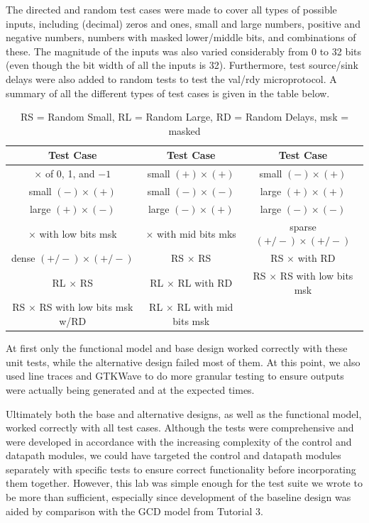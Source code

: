 \documentclass[10pt]{article}
\begin{document}
The directed and random test cases were made to cover all types of possible inputs, including (decimal) zeros and ones, small and large numbers, positive and negative numbers, numbers with masked lower/middle bits, and combinations of these. The magnitude of the inputs was also varied considerably from 0 to 32 bits (even though the bit width of all the inputs is 32). Furthermore, test source/sink delays were also added to random tests to test the val/rdy microprotocol. A summary of all the different types of test cases is given in the table below.
\begin{table}[h]
\begin{tabular}{|c | c | c|}
\hline
\textbf{Test Case}                    & \textbf{Test Case}                   & \textbf{Test Case}               \\
\hline
$\times$ of 0, 1, and $-1$            & small $(+) \times (+)$               & small $(-) \times (+)$           \\
small $(-) \times (+)$                & small $(-) \times (-)$               & large $(+) \times (+)$           \\
large $(+) \times (-)$                & large $(-) \times (+)$               & large $(-) \times (-)$           \\
$\times$ with low bits msk            & $\times$ with mid bits mks           & sparse $(+/-) \times (+/-)$      \\
dense  $(+/-) \times (+/-)$           & RS $\times$ RS                       & RS $\times$ with RD              \\
RL $\times$ RS                        & RL $\times$ RL with RD               & RS $\times$ RS with low bits msk \\
RS $\times$ RS with low bits msk w/RD & RL $\times$ RL with mid bits msk     &                                  \\
\hline                                                 
\end{tabular}
\caption{RS = Random Small, RL = Random Large, RD = Random Delays, msk = masked} 
\end{table}
At first only the functional model and base design worked correctly with these unit tests, while the alternative design failed most of them. At this point, we also used line traces and GTKWave to do more granular testing to ensure outputs were actually being generated and at the expected times. 

Ultimately both the base and alternative designs, as well as the functional model, worked correctly with all test cases. Although the tests were comprehensive and were developed in accordance with the increasing complexity of the control and datapath modules, we could have targeted the control and datapath modules separately with specific tests to ensure correct functionality before incorporating them together. However, this lab was simple enough for the test suite we wrote to be more than sufficient, especially since development of the baseline design was aided by comparison with the GCD model from Tutorial 3. 
\end{document}

